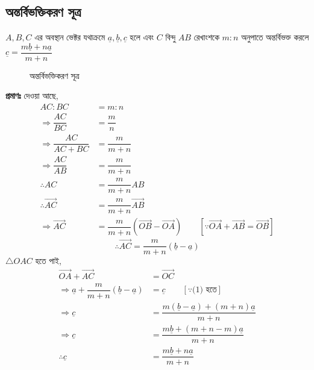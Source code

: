 \subsection*{অন্তর্বিভক্তিকরণ সূত্র}
\begin{tcolorbox}[colback=green!5!white,colframe=green!75!black]
	$A, B, C$ এর অবস্থান ভেক্টর যথাক্রমে $\underline{a}, \underline{b}, \underline{c}$ হলে এবং $C$ বিন্দু $AB$ রেখাংশকে $m:n$ অনুপাতে অন্তর্বিভক্ত করলে $\underline{c}=\dfrac{m\underline{b}+n\underline{a}}{m+n}$
\end{tcolorbox}
\begin{wrapfigure}[5]{r}{0.5\textwidth}
	\begin{center}
		
	\end{center}
	\caption{অন্তর্বিভক্তিকরণ সূত্র}
	\label{vec-fig-9}
\end{wrapfigure}
\textbf{প্রমাণঃ} দেওয়া আছে, 
\begin{align*}
	AC:BC &= m:n \\
	\Rightarrow \dfrac{AC}{BC} &= \dfrac{m}{n} \\
	\Rightarrow \dfrac{AC}{AC+BC} &= \dfrac{m}{m+n} \\
	\Rightarrow \dfrac{AC}{AB} &= \dfrac{m}{m+n} \\
	\therefore AC &= \dfrac{m}{m+n} AB \\
	\therefore \overrightarrow{AC} &= \dfrac{m}{m+n} \overrightarrow{AB} \\
	\Rightarrow \overrightarrow{AC} &= \dfrac{m}{m+n} (\overrightarrow{OB}-\overrightarrow{OA}) \quad \quad [\because \overrightarrow{OA}+\overrightarrow{AB}=\overrightarrow{OB}]
\end{align*}
\begin{equation}
	\therefore \overrightarrow{AC} = \dfrac{m}{m+n} (\underline{b}-\underline{a}) \tag{1}
\end{equation}
$\triangle OAC$ হতে পাই, 
\begin{align*}
	\overrightarrow{OA}+\overrightarrow{AC} &= \overrightarrow{OC} \\
	\Rightarrow \underline{a}+\dfrac{m}{m+n} (\underline{b}-\underline{a}) &= \underline{c} \quad \quad [\because \text{(1) হতে}]\\
	\Rightarrow \underline{c} &= \dfrac{m(\underline{b}-\underline{a})+(m+n)\underline{a}}{m+n}\\
	\Rightarrow \underline{c} &= \dfrac{m\underline{b}+(m+n-m)\underline{a}}{m+n} \\
	\therefore \underline{c} &= \dfrac{m\underline{b}+n\underline{a}}{m+n}
\end{align*}
\newpage
